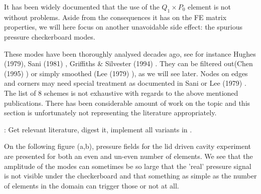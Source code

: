 
It has been widely documented that the use of the $Q_1 \times P_0$ element is 
not without problems. Aside from the 
consequences it has on the FE matrix properties, we will here focus on another unavoidable side effect: 
the spurious pressure checkerboard modes. 

These modes have been thoroughly analysed decades ago, see for instance
Hughes \etal (1979)\cite{hulb79}, 
Sani \etal (1981) \cite{sagl81a,sagl81b},
Griffiths \& Silvester (1994) \cite{grsi94}.
They can be filtered out(Chen (1995)  \cite{chpc95}) 
or simply smoothed (Lee \etal (1979) \cite{legs79}), as we will see later.
Nodes on edges and corners may need special treatment as documented in Sani \etal \cite{sagl81a} or
Lee \etal (1979) \cite{legs79}.
The list of 8 schemes is not exhaustive with regards to the above mentioned publications. 
There has been considerable amount of work on the topic and this section is 
unfortunately not representing the literature appropriately.

\mscthesis: Get relevant literature, digest it, implement all variants in .


On the following figure (a,b), pressure fields for the lid driven cavity experiment 
are presented for both an even and un-even number of elements. We see that 
the amplitude of the modes can sometimes be so large that the 'real' pressure signal is 
not visible under the checkerboard and that something as simple as the number of elements in the 
domain can trigger those or not at all.

